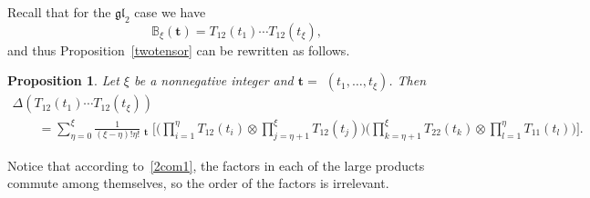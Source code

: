 \documentclass[pdftex]{sigma}
\numberwithin{equation}{section}
\newtheorem{Proposition}[Theorem]{Proposition}
 { \theoremstyle{definition}
\newtheorem{Definition}[Theorem]{Definition}
\newtheorem*{Example}{Example}
\newtheorem*{Remark}{Remark} }
\DeclareMathOperator{\Symb}{\overline{Sym} }
\begin{document}
Recall that for the $\mathfrak{gl}_2$ case we have
\begin{equation*}
{\mathbb{B}}_\xi(\boldsymbol{t})=T_{12} (t_{1} ) \cdots T_{12} (t_{\xi} ),
\end{equation*}
and thus Proposition~\ref{twotensor} can be rewritten as follows.
\begin{Proposition} \label{twotensorsA}
Let $\xi$ be a nonnegative integer and $\boldsymbol{t}=$ $(t_{1}, \dots, t_{\xi} )$. Then
\begin{gather}
\Delta ( T_{12} (t_{1} ) \cdots T_{12} (t_{\xi} ) )
\label{cop2}\\
\qquad{}=\sum_{\eta=0}^{\xi} \frac{1}{(\xi-\eta) ! \eta!} \Symb_{\boldsymbol{t}}\Biggl[ \Biggl(\prod_{i=1}^{\eta} T_{12} (t_i) \otimes \prod_{j=\eta+1}^{\xi } T_{12} (t_j) \Biggr)
\Biggl(\prod_{k=\eta+1}^{\xi } T _{22}(t_{k})\otimes \prod_{l=1}^{\eta} T _{11}(t_l)\Biggr) \Biggr].\nonumber
\end{gather}

\end{Proposition}
\begin{Remark}
Notice that according to~\eqref{2com1}, the factors in each of the large products commute among themselves, so the order of the factors is irrelevant.
\end{Remark}
\end{document}

